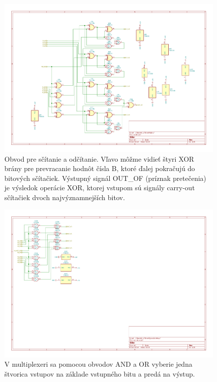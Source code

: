 \documentclass{article}
\begin{document}
    \begin{figure}[h!]
        \centering
        \includegraphics[width=.8\linewidth]{adder_sheet.pdf}
        \caption{Obvod pre sčítanie a odčítanie. Vľavo môžme vidieť štyri XOR brány pre prevracanie hodnôt čísla B, ktoré ďalej pokračujú do bitových sčítačiek. Výstupný signál OUT\_OF (príznak pretečenia) je výsledok operácie XOR, ktorej vstupom sú signály carry-out sčítačiek dvoch najvýznamnejších bitov.}
    \end{figure}

    \begin{figure}[h!]
        \centering
        \includegraphics[width=.8\linewidth]{mux_sheet.pdf}
        \caption{V multiplexeri sa pomocou obvodov AND a OR vyberie jedna štvorica vstupov na základe vstupného bitu a predá na výstup.}
    \end{figure}
    
\end{document}
